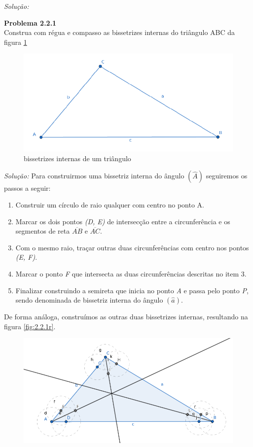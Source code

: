 \documentclass[a4paper, 11pt]{book}
\newenvironment{problem}[2][Problema] 
    { \begin{mdframed}[backgroundcolor=gray!20] \textbf{#1 #2} \\}
    {  \end{mdframed}}
\newenvironment{solution}
    {\textit{Solução:}}
    {}
\begin{document}
\begin{solution}
\begin{problem}{2.2.1}
    \label{prob:2.2.1}
    Construa com régua e compasso as bissetrizes internas do triângulo ABC da figura \ref{fig:2.2.1}
    \begin{figure}[H]
        \centering
        \includegraphics[scale=0.5]{imagens/2_2_1.png}
        \caption{bissetrizes internas de um triângulo}
        \label{fig:2.2.1}
    \end{figure}
\end{problem}
\begin{solution}
    Para construirmos uma bissetriz interna do ângulo $(\hat{A})$ seguiremos os passos a seguir:
    \begin{enumerate}[label=\textbf{\arabic*}:]
        \item  Construir um círculo de raio qualquer com centro no ponto A.
        \item  Marcar os dois pontos \textit{(D, E)}  de intersecção entre a circunferência e os segmentos de reta $\overline{AB}$ e $\overline{AC}$.
        \item Com o mesmo raio, traçar outras duas circunferências com centro nos pontos \textit{(E, F)}.  
        \item Marcar o ponto \textit{F} que intersecta as duas circunferências descritas no item 3.
        \item Finalizar construindo a semireta que inicia no ponto \textit{A} e passa pelo ponto \textit{P}, sendo denominada de bissetriz interna do ângulo $(\hat{a})$.  
    \end{enumerate}
    De forma análoga, construímos as outras duas bissetrizes internas, resultando na figura \ref{fig:2.2.1r}.
    \begin{figure}[H]
        \centering
        \includegraphics[scale=0.5]{imagens/2_2_1r.png}

\end{figure}
\end{solution}
\end{solution}
\end{document}
